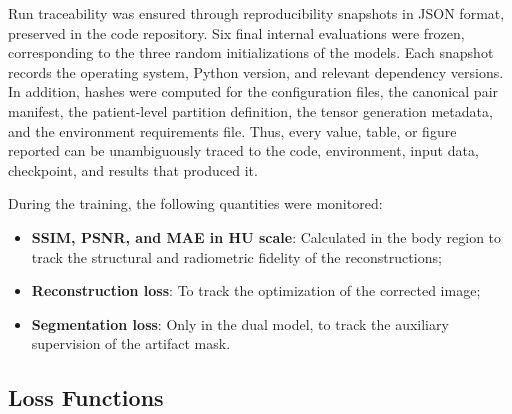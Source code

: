 Run traceability was ensured through reproducibility snapshots in JSON format, preserved in the code repository. Six final internal evaluations were frozen, corresponding to the three random initializations of the models.
Each snapshot records the operating system, Python version, and relevant dependency versions. In addition, hashes were computed for the configuration files, the canonical pair manifest, the patient-level partition definition, the tensor generation metadata, and the environment requirements file. Thus, every value, table, or figure reported can be unambiguously traced to the code, environment, input data, checkpoint, and results that produced it.

During the training, the following quantities were monitored:
\begin{itemize}
    \item \textbf{SSIM, PSNR, and MAE in HU scale}: Calculated in the body region to track the structural and radiometric fidelity of the reconstructions;
    \item \textbf{Reconstruction loss}: To track the optimization of the corrected image;
    \item \textbf{Segmentation loss}: Only in the dual model, to track the auxiliary supervision of the artifact mask.
\end{itemize}

\subsection{Loss Functions}


